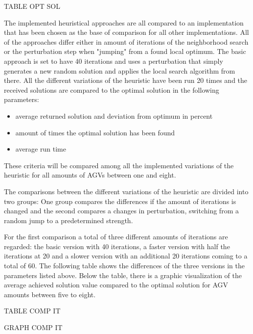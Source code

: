 TABLE OPT SOL

The implemented heuristical approaches are all compared to an implementation that has been chosen as the base of comparison for all other implementations. All of the approaches differ either in amount of iterations of the neighborhood search or the perturbation step when "jumping" from a found local optimum. The basic approach is set to have 40 iterations and uses a perturbation that simply generates a new random solution and applies the local search algorithm from there. All the different variations of the heuristic have been run 20 times and the received solutions are compared to the optimal solution in the following parameters:
\begin{itemize}
\item average returned solution and deviation from optimum in percent
\item amount of times the optimal solution has been found
\item average run time
\end{itemize}
These criteria will be compared among all the implemented variations of the heuristic for all amounts of AGVs between one and eight.

The comparisons between the different variations of the heuristic are divided into two groups: One group compares the differences if the amount of iterations is changed and the second compares a changes in perturbation, switching from a random jump to a predetermined strength.

For the first comparison a total of three different amounts of iterations are regarded: the basic version with 40 iterations, a faster version with half the iterations at 20 and a slower version with an additional 20 iterations coming to a total of 60. The following table shows the differences of the three versions in the parameters listed above. Below the table, there is a graphic visualization of the average achieved solution value compared to the optimal solution for AGV amounts between five to eight.

TABLE COMP IT

GRAPH COMP IT

